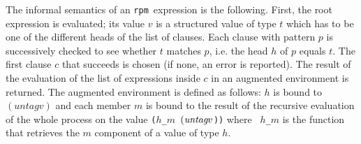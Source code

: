 \documentclass[a4paper,11pt]{article}
\newcommand{\rpm}{\texttt{rpm}}
\begin{document}
The informal semantics of an \rpm\ expression is the following. First,
the root expression is evaluated; its value $v$ is a structured value
of type $t$ which has to be one of the different heads of the list of
clauses. Each clause with pattern $p$ is successively checked to see
whether $t$ matches $p$, i.e. the head $h$ of $p$ equals $t$. The
first clause $c$ that succeeds is chosen (if none, an error is
reported). The result of the evaluation of the list of expressions
inside $c$ in an augmented environment is returned. The augmented
environment is defined as follows: $h$ is bound to $(untag v)$ and each member
$m$ is bound to the result of the recursive evaluation of the whole
process on the value \texttt{($h$\_$m$ $(\emph{untag} v$))} where {\tt
$h$\_$m$} is the function that retrieves the $m$ component of a value
of type $h$.
\end{document}
